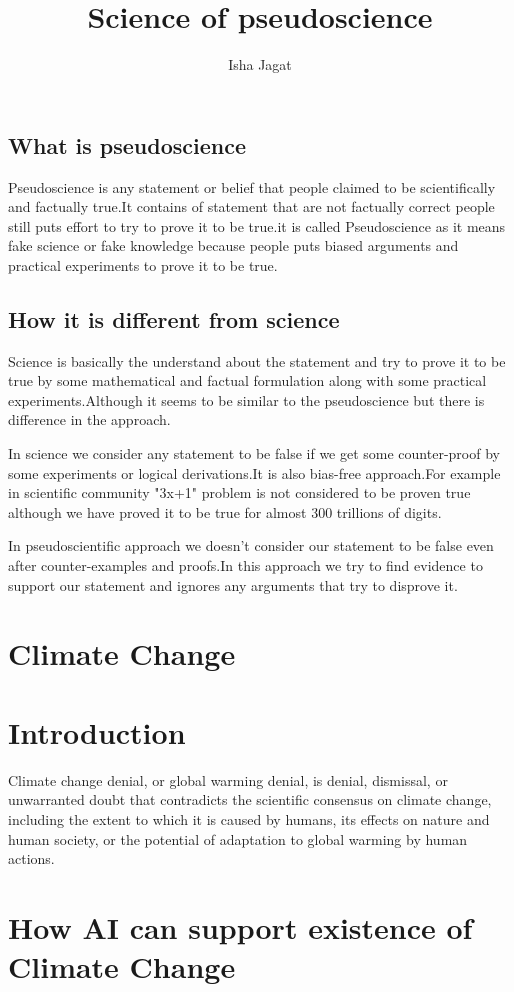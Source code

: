 \documentclass[12pt]{article}
\title{Science of pseudoscience}
\author{Isha Jagat}
\begin{document}
\maketitle
\subsection*{What is pseudoscience}
Pseudoscience is any statement or belief that people claimed to be scientifically and factually true.It contains of statement that are not factually correct people still puts effort to try to prove it to be true.it is called Pseudoscience as it means fake science or fake knowledge because people puts biased arguments and practical experiments to prove it to be true.
\subsection*{How it is different from science}
Science is basically the understand about the statement and try to prove it to be true by some mathematical and factual formulation along with some practical experiments.Although it seems to be similar to the pseudoscience but there is difference in the approach.
\par
In science we consider any statement to be false if we get some counter-proof by some experiments or logical derivations.It is also bias-free approach.For example in scientific community "3x+1" problem is not considered to be proven true although we have proved it to be true for almost 300 trillions of digits.
\par
In pseudoscientific approach we doesn't consider our statement to be false even after counter-examples and proofs.In this approach we try to find evidence to support our statement and ignores any arguments that try to disprove it.
\section*{Climate Change}
\section*{Introduction}
Climate change denial, or global warming denial, is denial, dismissal, or unwarranted doubt that contradicts the scientific consensus on climate change, including the extent to which it is caused by humans, its effects on nature and human society, or the potential of adaptation to global warming by human actions.

\section*{How AI can support existence of Climate Change}
\end{document}
